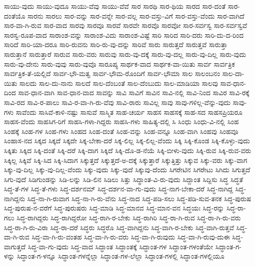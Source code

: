 {ಸಾಯು-ವುದು
ಸಾಯು-ವುದೂ
ಸಾಯು-ವೆವು
ಸಾಯು-ವೆವೆ
ಸಾರ
ಸಾರಥಿ
ಸಾರ-ಥಿಯ
ಸಾರದ
ಸಾರ-ದಂತೆ
ಸಾರ-ದಂತೆಯೊ
ಸಾರನು
ಸಾರಲು
ಸಾರ-ವನ್ನು
ಸಾರ-ವನ್ನೇ
ಸಾರ-ವಲ್ಲ
ಸಾರ-ವಸ್ತು-ವಿಗೆ
ಸಾರ-ವಸ್ತು-ವೆಂದು
ಸಾರ-ವಾಗಿದೆ
ಸಾರ-ವಾ-ಗಿ-ರುವ
ಸಾರ-ವಾದ
ಸಾರವು
ಸಾರವೂ
ಸಾರವೆ
ಸಾರವೇ
ಸಾರವೊ
ಸಾರವೋ
ಸಾರ-ಸರ್ವಸ್ವ
ಸಾರ-ಸರ್ವಸ್ವವೆ
ಸಾರಸ್ವ-ರೂಪ-ವಾದ
ಸಾರಾಂಶ-ವನ್ನು
ಸಾರಾಂಶ-ವಿದು
ಸಾರಾಂಶ-ವಿಷ್ಟೆ
ಸಾರಿ
ಸಾರಿದ
ಸಾರಿ-ದರು
ಸಾರಿ-ದು-ದ-ರಿಂದ
ಸಾರಿದೆ
ಸಾರಿ-ಯಾ-ದರೂ
ಸಾರಿ-ರುವನು
ಸಾರಿ-ರು-ವು-ದನ್ನು
ಸಾರಿವೆ
ಸಾರು
ಸಾರುತ್ತದೆ
ಸಾರುತ್ತವೆ
ಸಾರುತ್ತಾ
ಸಾರುತ್ತಾನೆ
ಸಾರುತ್ತಾರೆ
ಸಾರುವ
ಸಾರು-ವರು
ಸಾರುವು
ಸಾರು-ವು-ದಕ್ಕೆ
ಸಾರು-ವು-ದಲ್ಲ
ಸಾರು-ವು-ದಿಲ್ಲ
ಸಾರು-ವುದು
ಸಾರು-ವು-ದೇನು
ಸಾರು-ವುವು
ಸಾರು-ವುವೊ
ಸಾರೂಪ್ಯ
ಸಾರ್ಥಕ-ವಾದ
ಸಾರ್ಥಕ-ವಾ-ಯಿತು
ಸಾರ್ವ
ಸಾರ್ವತ್ರಿಕ
ಸಾರ್ವತ್ರಿಕ-ತೆ-ಯಲ್ಲಿದೆ
ಸಾರ್ವ-ಭೌ-ಮತ್ವ
ಸಾರ್ವ-ಭೌಮ-ರೊಂದಿಗೆ
ಸಾರ್ವ-ಭೌಮಾ
ಸಾಲ
ಸಾಲಂಬನಂ
ಸಾಲ-ದಾ-ಯಿತು
ಸಾಲದು
ಸಾಲ-ದು-ನಾನು
ಸಾಲದೆ
ಸಾಲ-ದೆಂಬಂತೆ
ಸಾಲ-ದೆಂಬುದು
ಸಾಲ-ಮಾಡಿಯಾ
ಸಾಲವು
ಸಾವ-ಧಾನ-ದಿಂದ
ಸಾವ-ಧಾನ-ವಾಗಿ
ಸಾವ-ಧಾನ-ವಾದ
ಸಾವನ್ನು
ಸಾವಿ
ಸಾವಿಗೆ
ಸಾವಿನ
ಸಾವಿ-ನಲ್ಲಿ
ಸಾವಿ-ನಿಂದ
ಸಾವಿರ
ಸಾವಿ-ರಕ್ಕೆ
ಸಾವಿ-ರದ
ಸಾವಿ-ರ-ಪಾಲು
ಸಾವಿ-ರ-ವಾ-ಗಿ-ರು-ವೆವು
ಸಾವಿ-ರಾರು
ಸಾವಿಲ್ಲ
ಸಾವು
ಸಾವು-ಗಳಿಲ್ಲ-ವೆನ್ನು-ವುದು
ಸಾವು-ಗಳು
ಸಾವೆಂದು
ಸಾಸಿವೆ-ಕಾಳಿ-ನಷ್ಟು
ಸಾಸುವೆ
ಸಾಸ್ಮಿತ
ಸಾಹ-ಚರ್ಯ
ಸಾಹಸ
ಸಾಹಸಕ್ಕೆ
ಸಾಹ-ಸದ
ಸಾಹಸಪ್ರಿಯರೂ
ಸಾಹಸ-ವೆಂದು
ಸಾಹಸಿಗ-ರಿಗೆ
ಸಾಹಸಿ-ಗಳಾ-ಗಿದ್ದರು
ಸಾಹಸಿ-ಗಳು
ಸಾಹಿತ್ಯ-ದಲ್ಲಿ
ಸಿ
ಸಿಂಧು
ಸಿಂಧು-ವಿ-ನಲ್ಲಿ
ಸಿಂಹ
ಸಿಂಹಕ್ಕೆ
ಸಿಂಹ-ಗಳ
ಸಿಂಹ-ಗಳು
ಸಿಂಹದ
ಸಿಂಹ-ದಂತೆ
ಸಿಂಹ-ವನ್ನು
ಸಿಂಹ-ವನ್ನೂ
ಸಿಂಹ-ವಾಗಿ
ಸಿಂಹವು
ಸಿಂಹವೂ
ಸಿಂಹಾಸ-ನದ
ಸಿಕ್ಕದ
ಸಿಕ್ಕದೆ
ಸಿಕ್ಕದೇ
ಸಿಕ್ಕ-ಬೇಕಾ-ದರೆ
ಸಿಕ್ಕ-ಲಿಲ್ಲ
ಸಿಕ್ಕ-ಲಿಲ್ಲ-ವೆಂದು
ಸಿಕ್ಕಿ
ಸಿಕ್ಕಿ-ಕೊಂಡ
ಸಿಕ್ಕಿ-ಕೊಳ್ಳು-ವುದು
ಸಿಕ್ಕಿತು
ಸಿಕ್ಕಿದ
ಸಿಕ್ಕಿ-ದಂತೆ
ಸಿಕ್ಕಿ-ದರೆ
ಸಿಕ್ಕಿ-ದಾಗ
ಸಿಕ್ಕಿದೆ
ಸಿಕ್ಕಿ-ದೊ-ಡ-ನೆಯೆ
ಸಿಕ್ಕಿ-ಬೀಳು-ವುದು
ಸಿಕ್ಕಿ-ರುವ
ಸಿಕ್ಕಿ-ರುವ-ವರು
ಸಿಕ್ಕಿಲ್ಲ
ಸಿಕ್ಕಿವೆ
ಸಿಕ್ಕಿ-ಸಿದ
ಸಿಕ್ಕಿ-ಸಿದಾಗ
ಸಿಕ್ಕುತ್ತದೆ
ಸಿಕ್ಕುತ್ತದೆ-ಅ-ದಕ್ಕೆ
ಸಿಕ್ಕುತ್ತಾರೆ
ಸಿಕ್ಕುತ್ತಿತ್ತು
ಸಿಕ್ಕುವ
ಸಿಕ್ಕು-ವರು
ಸಿಕ್ಕು-ವಾಗ
ಸಿಕ್ಕು-ವು-ದಿಲ್ಲ
ಸಿಕ್ಕು-ವು-ದಿಲ್ಲ-ವೆಂದು
ಸಿಕ್ಕು-ವುದು
ಸಿಕ್ಕು-ವುದೆ
ಸಿಕ್ಕುವು-ದೆಂದು
ಸಿಗರೇಟಿನ
ಸಿಗರೇಟು
ಸಿಗಿದು
ಸಿಗುತ್ತದೆ
ಸಿಗು-ವುದೆ
ಸಿಡಿಗುಂಡನ್ನು
ಸಿಡಿ-ಲನ್ನು
ಸಿಡಿ-ಲಿನ
ಸಿಡಿಲು
ಸಿತ್ತು
ಸಿದ್ಥಾಂತ-ವಿ-ರು-ವುದು
ಸಿದ್ದಾಂತ
ಸಿದ್ದಿಸು
ಸಿದ್ಧ
ಸಿದ್ಧತೆ
ಸಿದ್ಧ-ತೆ-ಗಳ
ಸಿದ್ಧ-ತೆ-ಗಳು
ಸಿದ್ಧ-ದರ್ಶನಮ್
ಸಿದ್ಧ-ದರ್ಶನ-ವಾ-ಗು-ವುದು
ಸಿದ್ಧ-ನಾಗ-ಬೇಕಾ-ದರೆ
ಸಿದ್ಧ-ನಾಗಿದ್ದ
ಸಿದ್ಧ-ನಾಗಿದ್ದನು
ಸಿದ್ಧ-ನಾ-ಗಿ-ರುವಾಗ
ಸಿದ್ಧ-ನಾ-ಗಿ-ರು-ವೆನು
ಸಿದ್ಧ-ನಾದ
ಸಿದ್ಧ-ಪಡಿ-ಸಲು
ಸಿದ್ಧ-ಪಡಿ-ಸುವ-ತನಕ
ಸಿದ್ಧ-ಪುರುಷ
ಸಿದ್ಧ-ಪುರುಷ-ನ-ವರೆಗೆ
ಸಿದ್ಧ-ಪುರುಷರು
ಸಿದ್ಧ-ಮಾಡಿ
ಸಿದ್ಧ-ಮಾನವ
ಸಿದ್ಧ-ಮಾನ-ವನ
ಸಿದ್ಧಯಃ
ಸಿದ್ಧ-ರನ್ನು
ಸಿದ್ಧ-ರಾ-ಗಲು
ಸಿದ್ಧ-ರಾಗಿದ್ದರು
ಸಿದ್ಧ-ರಾಗಿದ್ದರೋ
ಸಿದ್ಧ-ರಾಗಿ-ರ-ಬೇಕು
ಸಿದ್ಧ-ರಾಗಿರಿ
ಸಿದ್ಧ-ರಾ-ಗಿ-ರುವ
ಸಿದ್ಧ-ರಾ-ಗಿ-ರು-ವರು
ಸಿದ್ಧ-ರಾ-ಗಿ-ರು-ವಿರಾ
ಸಿದ್ಧ-ರಾ-ದರೆ
ಸಿದ್ಧರು
ಸಿದ್ಧರೊ
ಸಿದ್ಧ-ವಾಗಿದ್ದನು
ಸಿದ್ಧ-ವಾಗಿ-ರ-ಬೇಕು
ಸಿದ್ಧ-ವಾಗಿ-ರುತ್ತವೆ
ಸಿದ್ಧ-ವಾ-ಗಿ-ರುವ
ಸಿದ್ಧ-ವಾ-ಗಿ-ರು-ವಂತಹ
ಸಿದ್ಧ-ವಾ-ಗಿ-ರು-ವರು
ಸಿದ್ಧ-ವಾ-ಗಿ-ರುವುದು
ಸಿದ್ಧ-ವಾ-ಗಿ-ರುವು-ದುಈ
ಸಿದ್ಧ-ವಾಗುತ್ತದೆ
ಸಿದ್ಧ-ವಾ-ಗು-ವುದು
ಸಿದ್ಧ-ವಾದ
ಸಿದ್ಧಾಂತ
ಸಿದ್ಧಾಂತಕ್ಕೆ
ಸಿದ್ಧಾಂತ-ಗಳ
ಸಿದ್ಧಾಂತ-ಗಳಂತೆಯೇ
ಸಿದ್ಧಾಂತ-ಗ-ಳನ್ನು
ಸಿದ್ಧಾಂತ-ಗ-ಳನ್ನೂ
ಸಿದ್ಧಾಂತ-ಗಳನ್ನೆಲ್ಲಾ
ಸಿದ್ಧಾಂತ-ಗಳ-ಲೆಲ್ಲಾ
ಸಿದ್ಧಾಂತ-ಗಳಲ್ಲಿ
ಸಿದ್ಧಾಂತ-ಗಳಲ್ಲಿಯೂ
}
